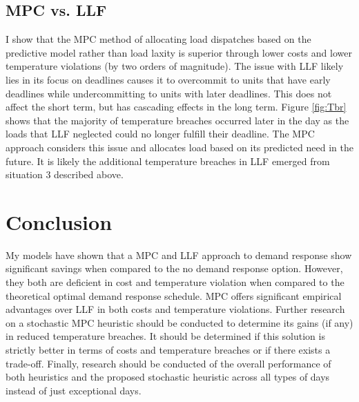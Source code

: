 \documentclass[journal]{IEEEtran}
\begin{document}
\subsection{MPC vs. LLF}
I show that the MPC method of allocating load dispatches based on the predictive model rather than load laxity is superior through lower costs and lower temperature violations (by two orders of magnitude). The issue with LLF likely lies in its focus on deadlines causes it to overcommit to units that have early deadlines while undercommitting to units with later deadlines. This does not affect the short term, but has cascading effects in the long term. Figure \ref{fig:Tbr} shows that the majority of temperature breaches occurred later in the day as the loads that LLF neglected could no longer fulfill their deadline. The MPC approach considers this issue and allocates load based on its predicted need in the future. It is likely the additional temperature breaches in LLF emerged from situation 3 described above.
 

\section{Conclusion}

My models have shown that a MPC and LLF approach to demand response show significant savings when compared to the no demand response option. However, they both are deficient in cost and temperature violation when compared to the theoretical optimal demand response schedule. MPC offers significant empirical advantages over LLF in both costs and temperature violations. Further research on a stochastic MPC heuristic should be conducted to determine its gains (if any) in reduced temperature breaches. It should be determined if this solution is strictly better in terms of costs and temperature breaches or if there exists a trade-off. Finally, research should be conducted of the overall performance of both heuristics and the proposed stochastic heuristic across all types of days instead of just exceptional days.





\end{document}
